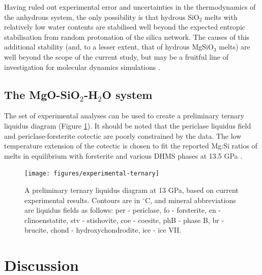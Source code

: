 \documentclass[review]{elsarticle}
\begin{document}
Having ruled out experimental error and uncertainties in the thermodynamics of the anhydrous system, the only possibility is that hydrous SiO$_2$ melts with relatively low water contents are stabilised well beyond the expected entropic stabilisation from random protonation of the silica network. The causes of this additional stability (and, to a lesser extent, that of hydrous MgSiO$_3$ melts) are well beyond the scope of the current study, but may be a fruitful line of investigation for molecular dynamics simulations \citep[e.g.][]{KS2010}.


\clearpage
\subsection{The MgO-SiO$_2$-H$_2$O system}
The set of experimental analyses can be used to create a preliminary ternary liquidus diagram (Figure \ref{fig:ternary}). It should be noted that the periclase liquidus field and periclase-forsterite cotectic are poorly constrained by the data. The low temperature extension of the cotectic is chosen to fit the reported Mg:Si ratios of melts in equilibrium with forsterite and various DHMS phases at 13.5 GPa \citep{MSUP2007}. 

 
\begin{figure}[ht!]
  \centering
      \texttt{[image: figures/experimental-ternary]}
  \caption{A preliminary ternary liquidus diagram at 13 GPa, based on current experimental results. Contours are in $^{\circ}$C, and mineral abbreviations are liquidus fields as follows: per - periclase, fo - forsterite, en - clinoenstatite, stv - stishovite, coe - coesite, phB - phase B, br - brucite, chond - hydroxychondrodite, ice - ice VII.}
  \label{fig:ternary}
\end{figure}


\section{Discussion}
\end{document}

